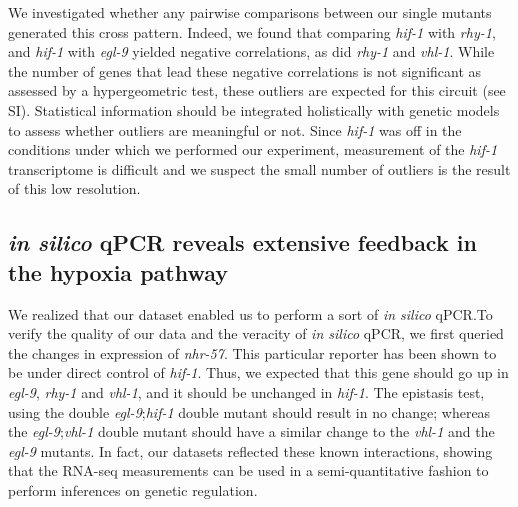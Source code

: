 \documentclass[9pt,twocolumn,twoside]{pnas-new}
\newcommand{\egl}{\emph{egl-9}}
\newcommand{\rhy}{\emph{rhy-1}}
\newcommand{\vhl}{\emph{vhl-1}}
\newcommand{\hif}{\emph{hif-1}}
\newcommand{\nhr}{\emph{nhr-57}}
\begin{document}
We investigated whether any pairwise comparisons between our single mutants generated this cross pattern. Indeed, we found that comparing \hif{} with \rhy{}, and \hif{} with \egl{} yielded negative correlations, as did \rhy{} and \vhl{}. While the number of genes that lead these negative correlations is not significant as assessed by a hypergeometric test, these outliers are expected for this circuit (see SI). Statistical information should be integrated holistically with genetic models to assess whether outliers are meaningful or not. Since \hif{} was off in the conditions under which we performed our experiment, measurement of the \hif{} transcriptome is difficult and we suspect the small number of outliers is the result of this low resolution.


\subsection{\emph{in silico} qPCR reveals extensive feedback in the hypoxia pathway}
\label{sub:qPCR}
We realized that our dataset enabled us to perform a sort of \emph{in silico} qPCR.\@ To verify the quality of our data and the veracity of \emph{in silico} qPCR, we first queried the changes in expression of \nhr{}. This particular reporter has been shown to be under direct control of \hif{}. Thus, we expected that this gene should go up in \egl{}, \rhy{} and \vhl{}, and it should be unchanged in \hif{}. The epistasis test, using the double \egl{};\hif{} double mutant should result in no change; whereas the \egl{};\vhl{} double mutant should have a similar change to the \vhl{} and the \egl{} mutants. In fact, our datasets reflected these known interactions, showing that the RNA-seq measurements can be used in a semi-quantitative fashion to perform inferences on genetic regulation.
\end{document}
